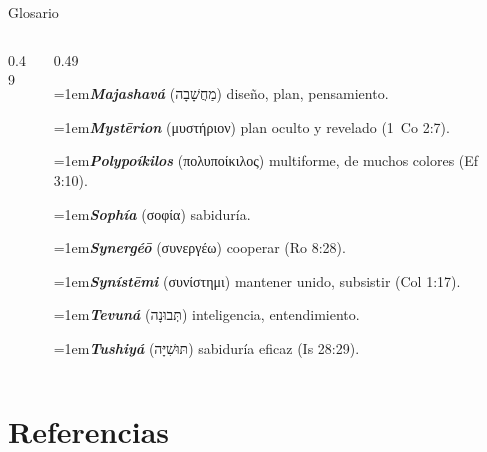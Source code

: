 \documentclass[hyperref={bookmarks=false},aspectratio=169]{beamer}
\newcommand{\heb}[1]{\mbox{\foreignlanguage{hebrew}{#1}}}
\newcommand{\grc}[1]{\foreignlanguage{ancientgreek}{#1}}
\begin{document}
\begin{frame}{Glosario}
\begin{columns}[t,onlytextwidth]
\begin{column}{0.49\textwidth}
\end{column}
\begin{column}{0.49\textwidth}

\par\noindent\hangindent=1em{\color{azul}\textbf{\emph{Majashavá}}} (\heb{מַחֲשָׁבָה}) diseño, plan, pensamiento.\par\vspace{2pt}
\par\noindent\hangindent=1em{\color{azul}\textbf{\emph{Mystērion}}} (\grc{μυστήριον}) plan oculto y revelado (1~Co 2:7).\par\vspace{2pt}
\par\noindent\hangindent=1em{\color{azul}\textbf{\emph{Polypoíkilos}}} (\grc{πολυποίκιλος}) multiforme, de muchos colores (Ef 3:10).\par\vspace{2pt}
\par\noindent\hangindent=1em{\color{azul}\textbf{\emph{Sophía}}} (\grc{σοφία}) sabiduría.\par\vspace{2pt}
\par\noindent\hangindent=1em{\color{azul}\textbf{\emph{Synergéō}}} (\grc{συνεργέω}) cooperar (Ro 8:28).\par\vspace{2pt}
\par\noindent\hangindent=1em{\color{azul}\textbf{\emph{Synístēmi}}} (\grc{συνίστημι}) mantener unido, subsistir (Col 1:17).\par\vspace{2pt}
\par\noindent\hangindent=1em{\color{azul}\textbf{\emph{Tevuná}}} (\heb{תְּבוּנָה}) inteligencia, entendimiento.\par\vspace{2pt}
\par\noindent\hangindent=1em{\color{azul}\textbf{\emph{Tushiyá}}} (\heb{תּוּשִׁיָּה}) sabiduría eficaz (Is 28:29).\par\vspace{2pt}

\end{column}
\end{columns}
\end{frame}

\section{Referencias}
\end{document}
